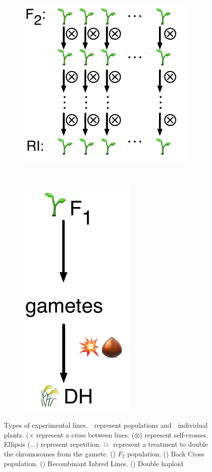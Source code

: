 \begin{figure}
\begin{subfigure}{0.45\textwidth}
\centering
\caption{}
\label{fig:lit:ri}
\includegraphics[height=0.20\textheight]{LitReview/Figures/crosses/RI.pdf}
\end{subfigure}
~
\begin{subfigure}{0.45\textwidth}
\centering
\caption{}
\label{fig:lit:dh}
\includegraphics[height=0.20\textheight]{LitReview/Figures/crosses/DH.pdf}
\end{subfigure}

\caption[Types of experimental lines]{Types of experimental lines. 🌾 represent populations and 🌱 individual plants. ($\times$ represent a cross between lines. ($\otimes$) represent self-crosses. Ellipsis ($\ldots$) represent repetition. 💥🌰 represent a treatment to double the chromosomes from the gamete. () $F_{2}$ population. () Back Cross population. () Recombinant Inbred Lines. () Double haploid}
\end{figure}

